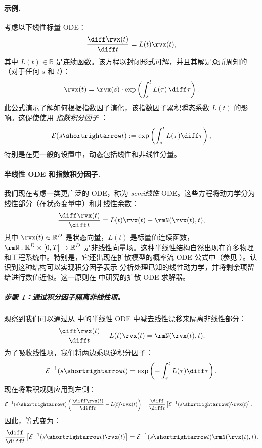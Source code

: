 \paragraph{示例.}
考虑以下线性标量 ODE：
\[
\frac{\diff \rvx(t)}{\diff t} = L(t)\rvx(t),
\]
其中 $L(t) \in \mathbb{R}$ 是连续函数。该方程以封闭形式可解，并且其解是众所周知的（对于任何 $s$ 和 $t$）：
\[
\rvx(t) = \rvx(s) \cdot \exp\left( \int_s^t L(\tau) \,\diff \tau \right).
\]
此公式演示了解如何根据指数因子演化，该指数因子累积瞬态系数 $L(t)$ 的影响。这促使使用 \emph{ 指数积分因子 }：
\begin{align}\label{eq:exp-int-factor}
    \mathcal{E}(s \shortrightarrow t) := \exp\left( \int_s^t L(\tau)\diff \tau \right),
\end{align}
特别是在更一般的设置中，动态包括线性和非线性分量。


\paragraph{半线性 ODE 和指数积分因子.}
我们现在考虑一类更广泛的 ODE，称为 \emph{semi线性} ODE。这些方程将动力学分为线性部分（在状态变量中）和非线性余数：
\begin{align}\label{eq:semilinear-ode}
    \frac{\diff \rvx(t)}{\diff t} = L(t)\rvx(t) + \rmN(\rvx(t), t),
\end{align}
其中 $\rvx(t) \in \mathbb{R}^D$ 是状态向量，$L(t)$ 是标量值连续函数，$\rmN: \mathbb{R}^D \times [0,T] \to \mathbb{R}^D$ 是非线性向量场。这种半线性结构自然出现在许多物理和工程系统中。特别是，它还出现在扩散模型的概率流 ODE 公式中（参见 ）。认识到这种结构可以实现积分因子表示
分析处理已知的线性动力学，并将剩余项留给进行数值近似。这一原则在
 中研究的扩散 ODE 求解器。


\subparagraph{步骤 1：通过积分因子隔离非线性项。}
观察到我们可以通过从  中的半线性 ODE 中减去线性漂移来隔离非线性部分：
\[
\frac{\diff \rvx(t)}{\diff t} - L(t)\rvx(t) = \rmN(\rvx(t), t).
\]
为了吸收线性项，我们将两边乘以逆积分因子：
\[
\mathcal{E}^{-1}(s \shortrightarrow t) = \exp\left(-\int_s^t L(\tau)\diff \tau \right).
\]
现在将乘积规则应用到左侧：
\begin{align*}
\mathcal{E}^{-1}(s \shortrightarrow t) \left( \frac{\diff \rvx(t)}{\diff t} - L(t)\rvx(t) \right)
&= \frac{\diff}{\diff t} \left[ \mathcal{E}^{-1}(s \shortrightarrow t) \rvx(t) \right].
\end{align*}
因此，等式变为：
\[
\frac{\diff}{\diff t} \left[ \mathcal{E}^{-1}(s \shortrightarrow t) \rvx(t) \right]
= \mathcal{E}^{-1}(s \shortrightarrow t) \rmN(\rvx(t), t).
\]


